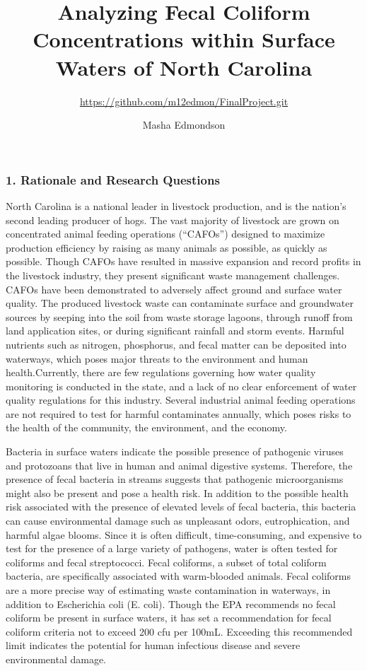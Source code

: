 \documentclass[12pt,]{article}
\title{Analyzing Fecal Coliform Concentrations within Surface Waters of North
Carolina}
\subtitle{\url{https://github.com/m12edmon/FinalProject.git}}
\author{Masha Edmondson}
\date{}
\begin{document}
\maketitle

\newpage
\tableofcontents 
\newpage
\listoftables 
\newpage
\listoffigures 
\newpage

\hypertarget{rationale-and-research-questions}{%
\subsubsection{1. Rationale and Research
Questions}\label{rationale-and-research-questions}}

North Carolina is a national leader in livestock production, and is the
nation's second leading producer of hogs. The vast majority of livestock
are grown on concentrated animal feeding operations (``CAFOs'') designed
to maximize production efficiency by raising as many animals as
possible, as quickly as possible. Though CAFOs have resulted in massive
expansion and record profits in the livestock industry, they present
significant waste management challenges. CAFOs have been demonstrated to
adversely affect ground and surface water quality. The produced
livestock waste can contaminate surface and groundwater sources by
seeping into the soil from waste storage lagoons, through runoff from
land application sites, or during significant rainfall and storm events.
Harmful nutrients such as nitrogen, phosphorus, and fecal matter can be
deposited into waterways, which poses major threats to the environment
and human health.Currently, there are few regulations governing how
water quality monitoring is conducted in the state, and a lack of no
clear enforcement of water quality regulations for this industry.
Several industrial animal feeding operations are not required to test
for harmful contaminates annually, which poses risks to the health of
the community, the environment, and the economy.

Bacteria in surface waters indicate the possible presence of pathogenic
viruses and protozoans that live in human and animal digestive systems.
Therefore, the presence of fecal bacteria in streams suggests that
pathogenic microorganisms might also be present and pose a health risk.
In addition to the possible health risk associated with the presence of
elevated levels of fecal bacteria, this bacteria can cause environmental
damage such as unpleasant odors, eutrophication, and harmful algae
blooms. Since it is often difficult, time-consuming, and expensive to
test for the presence of a large variety of pathogens, water is often
tested for coliforms and fecal streptococci. Fecal coliforms, a subset
of total coliform bacteria, are specifically associated with
warm-blooded animals. Fecal coliforms are a more precise way of
estimating waste contamination in waterways, in addition to Escherichia
coli (E. coli). Though the EPA recommends no fecal coliform be present
in surface waters, it has set a recommendation for fecal coliform
criteria not to exceed 200 cfu per 100mL. Exceeding this recommended
limit indicates the potential for human infectious disease and severe
environmental damage.
\end{document}
